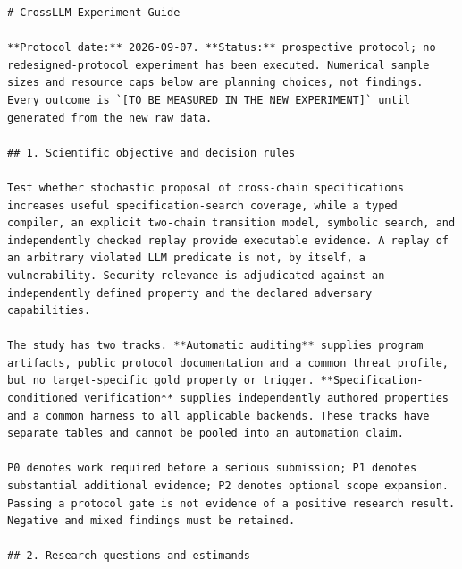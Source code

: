 \documentclass[11pt,a4paper]{article}
\begin{document}
\begin{verbatim}
# CrossLLM Experiment Guide

**Protocol date:** 2026-09-07. **Status:** prospective protocol; no redesigned-protocol experiment has been executed. Numerical sample sizes and resource caps below are planning choices, not findings. Every outcome is `[TO BE MEASURED IN THE NEW EXPERIMENT]` until generated from the new raw data.

## 1. Scientific objective and decision rules

Test whether stochastic proposal of cross-chain specifications increases useful specification-search coverage, while a typed compiler, an explicit two-chain transition model, symbolic search, and independently checked replay provide executable evidence. A replay of an arbitrary violated LLM predicate is not, by itself, a vulnerability. Security relevance is adjudicated against an independently defined property and the declared adversary capabilities.

The study has two tracks. **Automatic auditing** supplies program artifacts, public protocol documentation and a common threat profile, but no target-specific gold property or trigger. **Specification-conditioned verification** supplies independently authored properties and a common harness to all applicable backends. These tracks have separate tables and cannot be pooled into an automation claim.

P0 denotes work required before a serious submission; P1 denotes substantial additional evidence; P2 denotes optional scope expansion. Passing a protocol gate is not evidence of a positive research result. Negative and mixed findings must be retained.

## 2. Research questions and estimands


\end{verbatim}
\end{document}

